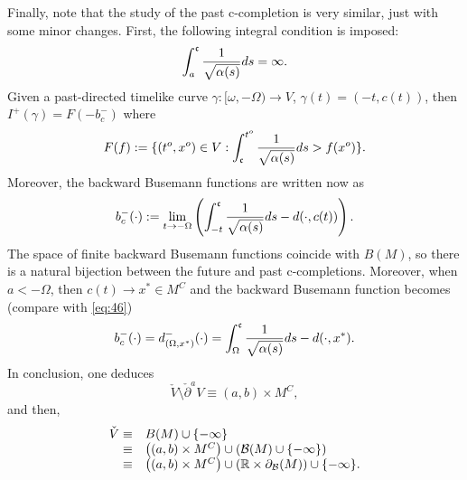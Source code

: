             \smallskip

            Finally, note that the study of the past c-completion is very similar, just with some minor changes. First, the following integral condition is imposed:
              \[
\int_{a}^{\mathfrak{c}} \frac{1}{\sqrt{\alpha(s)}}ds=\infty.
                \]
              Given a past-directed timelike curve $\gamma:[\omega,-\Omega)\rightarrow V$, $\gamma(t)=(-t,c(t))$, then $I^+(\gamma)=F(-b^-_{c})$ where
            \[
F(f):=\{ (t^o,x^o)\in V:\int_{\mathfrak{c}}^{t^o}\frac{1}{\sqrt{\alpha(s)}}ds>f(x^o)\}.
              \]
              Moreover, the backward Busemann functions are written now as
              \[
              b^-_{c}(\cdot):=\lim_{t\rightarrow -\Omega}\left(\int^{\mathfrak{c}}_{-t}\frac{1}{\sqrt{\alpha(s)}}ds -d(\cdot,c(t))\right). 
              \]
              The space of finite backward Busemann functions coincide with $B(M)$, so there is a natural bijection between the future and past c-completions. Moreover,  when $a<-\Omega$, then $c(t)\rightarrow x^*\in M^C$ and the backward Busemann function becomes (compare with \eqref{eq:46})
              \begin{equation}
                \label{eq:48}
                b^-_{c}(\cdot)=d^-_{(\Omega,x^*)}(\cdot)=\int^{\mathfrak{c}}_{\Omega}\frac{1}{\sqrt{\alpha(s)}}ds-d(\cdot,x^*).
              \end{equation}
In conclusion, one deduces
\[
\check{V}\setminus \check{\partial}^{a}V\equiv (a,b) \times M^C,
  \]
  and then,
  \[\begin{array}{rl}
      \check{V} \equiv & B(M)\cup \{-\infty\}   \\
         \equiv  & \left( (a,b) \times M^C  \right) \cup \left({\cal B}(M)\cup \{-\infty\} \right) \\ \equiv & \left( (a,b) \times M^C  \right) \cup \left({\mathbb R}\times \partial_{\cal B}(M)\right) \cup \{-\infty\}.
  \end{array}
  \]




